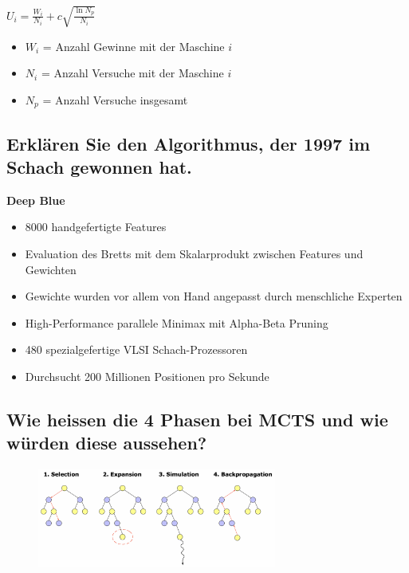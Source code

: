 \documentclass[a4paper]{article}
\begin{document}
		$U_{i} = \frac{W_{i}}{N_{i}} + c \sqrt{\frac{\ln N_{p}}{N_{i}}}$
		
		\vspace{1em}
		
		\begin{itemize}
			\item $W_{i}$ = Anzahl Gewinne mit der Maschine $i$
			\item $N_{i}$ = Anzahl Versuche mit der Maschine $i$
			\item $N_{p}$ = Anzahl Versuche insgesamt
		\end{itemize}
		
		\subsection{Erklären Sie den Algorithmus, der 1997 im Schach gewonnen hat.}
		
		\textbf{Deep Blue}
		\begin{itemize}
			\item 8000 handgefertigte Features
			\item Evaluation des Bretts mit dem Skalarprodukt zwischen Features und Gewichten
			\item Gewichte wurden vor allem von Hand angepasst durch menschliche Experten
			\item High-Performance parallele Minimax mit Alpha-Beta Pruning
			\item 480 spezialgefertige VLSI Schach-Prozessoren
			\item Durchsucht 200 Millionen Positionen pro Sekunde
		\end{itemize}
		
		\subsection{Wie heissen die 4 Phasen bei MCTS und wie würden diese aussehen?}
		
		\begin{figure}[htb!]
			\centering
			\includegraphics[width=0.7\textwidth]{img/mcts_phasen.png}
		\end{figure}
		
	
\end{document}
